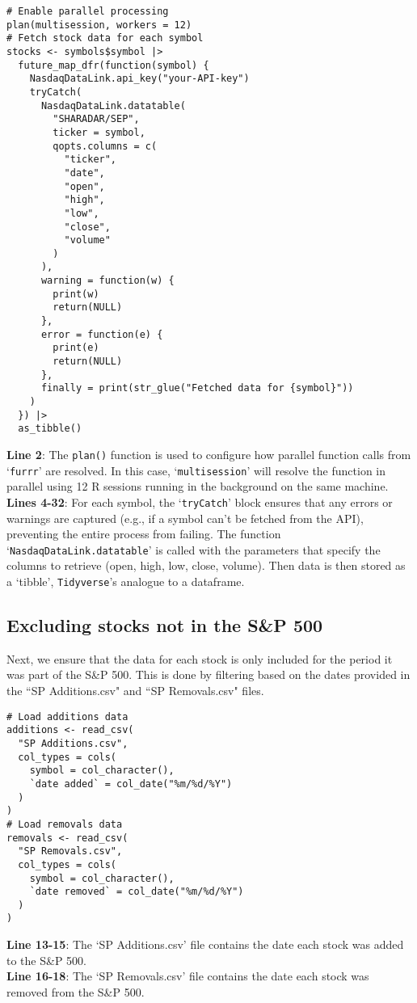 \documentclass[12pt,letterpaper]{article}
\begin{document}
\begin{verbatim}
# Enable parallel processing
plan(multisession, workers = 12)
# Fetch stock data for each symbol
stocks <- symbols$symbol |>
  future_map_dfr(function(symbol) {
    NasdaqDataLink.api_key("your-API-key")
    tryCatch(
      NasdaqDataLink.datatable(
        "SHARADAR/SEP", 
        ticker = symbol, 
        qopts.columns = c(
          "ticker", 
          "date", 
          "open", 
          "high", 
          "low", 
          "close", 
          "volume"
        )
      ),
      warning = function(w) {
        print(w)
        return(NULL)
      },
      error = function(e) {
        print(e)
        return(NULL)
      },
      finally = print(str_glue("Fetched data for {symbol}"))
    )
  }) |>
  as_tibble()
\end{verbatim}
\textbf{Line 2}: The \texttt{plan()} function is used to configure how parallel function calls from `\texttt{furrr}' are resolved. In this case, `\texttt{multisession}' will resolve the function in parallel using 12 R sessions running in the background on the same machine.\\
\textbf{Lines 4-32}: For each symbol, the `\texttt{tryCatch}' block ensures that any errors or warnings are captured (e.g., if a symbol can't be fetched from the API), preventing the entire process from failing. The function `\texttt{NasdaqDataLink.datatable}' is called with the parameters that specify the columns to retrieve (open, high, low, close, volume). Then data is then stored as a `tibble', \texttt{Tidyverse}'s analogue to a dataframe.

\subsection{Excluding stocks not in the S\&P 500}
Next, we ensure that the data for each stock is only included for the period it
was part of the S\&P 500. This is done by filtering based on the dates provided
in the ``SP Additions.csv" and ``SP Removals.csv" files.

\begin{verbatim}
# Load additions data
additions <- read_csv(
  "SP Additions.csv",
  col_types = cols(
    symbol = col_character(),
    `date added` = col_date("%m/%d/%Y")
  )
)
# Load removals data
removals <- read_csv(
  "SP Removals.csv",
  col_types = cols(
    symbol = col_character(),
    `date removed` = col_date("%m/%d/%Y")
  )
)
\end{verbatim}
\textbf{Line 13-15}: The `SP Additions.csv' file contains the date each stock was added to the S\&P 500.\\
\textbf{Line 16-18}: The `SP Removals.csv' file contains the date each stock was removed from the S\&P 500.
\end{document}
